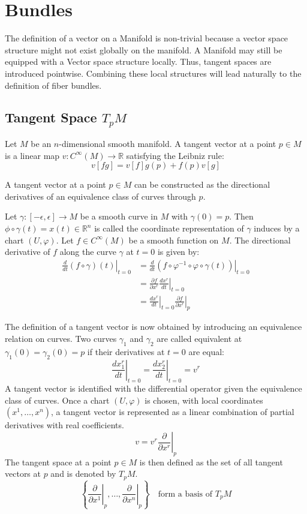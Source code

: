 
\chapter{Bundles}

  The definition of a vector on a Manifold is non-trivial because a vector space structure might not exist globally on the manifold. A Manifold may still be equipped with a Vector space structure locally. Thus, tangent spaces are introduced pointwise. Combining these local structures will lead naturally to the definition of fiber bundles.

\section{Tangent Space $T_pM$}

  Let $M$ be an $n$-dimensional smooth manifold. A tangent vector at a point $p \in M$ is a linear map $v: C^\infty(M) \to \mathbb{R}$ satisfying the Leibniz rule\cite{FredericSchullerDifferentialstructurespivotalconcepttangentvectorspacesLec09FredericSchuller2015}:
 \[ v[fg] = v[f]g(p) + f(p)v[g] \]

  A tangent vector at a point $p \in M$ can be constructed as the directional derivatives of an equivalence class of curves through $p$\cite{NakaharaGeometrytopologyphysics2005}.

  Let $\gamma: [-\epsilon, \epsilon] \to M$ be a smooth curve in $M$ with $\gamma(0)=p$. Then $\phi \circ \gamma(t) = x(t) \in \mathbb{R}^n$ is called the coordinate representation of $\gamma$ induces by a chart $(U, \varphi)$.
Let $f \in C^\infty(M)$ be a smooth function on $M$. The directional derivative of $f$ along the curve $\gamma$ at $t=0$ is given by:
\begin{align*}
\left. \frac{d}{dt} (f \circ \gamma)(t) \right|_{t=0}
  &= \left. \frac{d}{dt} \left( f\circ \varphi^{-1}\circ\varphi\circ\gamma(t) \right) \right|_{t=0} \\
&= \left. \frac{\partial f}{\partial x^r} \frac{d x^r}{dt} \right|_{t=0} \\
&= \left. \frac{d x^r}{dt} \right|_{t=0} \left. \frac{\partial f}{\partial x^r} \right|_p
\end{align*}

The definition of a tangent vector is now obtained by introducing an equivalence relation on curves. Two curves $\gamma_1$ and $\gamma_2$ are called equivalent at $\gamma_1(0)=\gamma_2(0)=p$ if their derivatives at $t=0$ are equal:
\[
\left. \frac{d x_1^r}{dt} \right|_{t=0}
= \left. \frac{d x_2^r}{dt} \right|_{t=0}
= v^r
\]
A tangent vector is identified with the differential operator given the equivalence class of curves. Once a chart $(U, \varphi)$ is chosen, with local coordinates $(x^1, \dots, x^n)$, a tangent vector is represented as a linear combination of partial derivatives with real coefficients.
\[
v = v^r \left. \frac{\partial}{\partial x^r} \right|_p
\]
The tangent space at a point $p \in M$ is then defined as the set of all tangent vectors at $p$ and is denoted by $T_pM$.
\[
\left\{ \left. \frac{\partial}{\partial x^1} \right|_p, \dots, \left. \frac{\partial}{\partial x^n} \right|_p \right\} \quad \text{form a basis of } T_pM
\]



